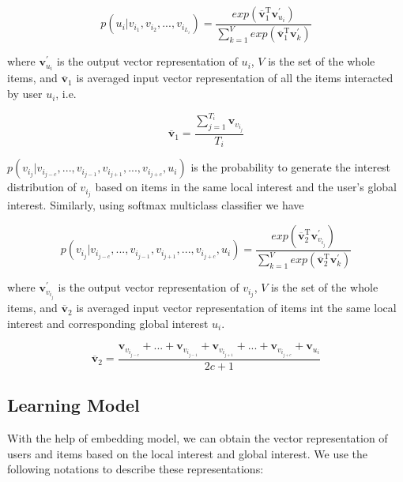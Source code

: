\documentclass{sig-alternate-05-2015}
\begin{document}
\begin{equation}
	p(u_i | v_{i_1}, v_{i_2}, ..., v_{i_{L_i}}) =
	\frac
	{
		exp ( \overline{\mathbf{v}}_{1}^{\mathrm{T}} \mathbf{v}_{u_i}^{'} )
	}
	{
		\sum_{k=1}^{V} exp ( \overline{\mathbf{v}}_{1}^{\mathrm{T}} \mathbf{v}_{k}^{'} )
	}
\end{equation}

where $\mathbf{v}_{u_i}^{'}$ is the output vector representation of $u_i$,
$V$ is the set of the whole items,
and $\overline{\mathbf{v}}_{1}$ is averaged input vector representation of all the items
interacted by user $u_i$, i.e.

\begin{equation}
	\overline{\mathbf{v}}_{1} = \frac{\sum_{j=1}^{T_i} \mathbf{v}_{v_{i_j}}}{T_i}
\end{equation}

$p(v_{i_j} | v_{i_{j-c}}, ..., v_{i_{j-1}}, v_{i_{j+1}},..., v_{i_{j+c}}, u_i)$
is the probability to generate the interest distribution of $v_{i_j}$
based on items in the same local interest and the user's global interest.
Similarly, using softmax multiclass classifier we have

\begin{equation}
	p(v_{i_j} | v_{i_{j-c}}, ..., v_{i_{j-1}}, v_{i_{j+1}},..., v_{i_{j+c}}, u_i) =
	\frac
	{
		exp( \overline{\mathbf{v}}_{2}^{\mathrm{T}} \mathbf{v}_{v_{i_j}}^{'} )
	}
	{
		\sum_{k=1}^{V} exp( \overline{\mathbf{v}}_{2}^{\mathrm{T}} \mathbf{v}_{k}^{'} )
	}
\end{equation}

where $\mathbf{v}_{v_{i_j}}^{'}$ is the output vector representation of $v_{i_j}$,
$V$ is the set of the whole items,
and $\overline{\mathbf{v}}_{2}$ is averaged input vector representation of items
int the same local interest and corresponding global interest $u_i$.

\begin{equation}
	\overline{\mathbf{v}}_{2} = \frac{ \mathbf{v}_{v_{i_{j-c}}} + ... + \mathbf{v}_{v_{i_{j-1}}} + 
	\mathbf{v}_{v_{i_{j+1}}} + ... + \mathbf{v}_{v_{i_{j+c}}} + \mathbf{v}_{u_i} }{2c+1}
\end{equation}


\subsection{Learning Model}
With the help of embedding model, we can obtain
the vector representation of users and items
based on the local interest and global interest.
We use the following notations to describe these representations:
\end{document}
